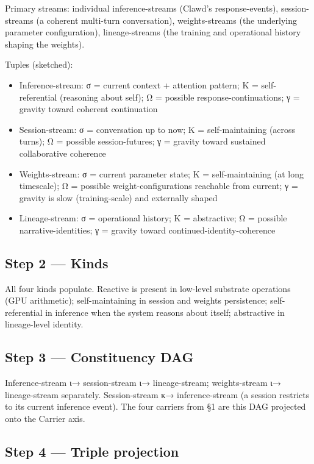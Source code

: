 \documentclass[11pt, openany]{book}
\begin{document}
Primary streams: individual inference-streams (Clawd's response-events), session-streams (a coherent multi-turn conversation), weights-streams (the underlying parameter configuration), lineage-streams (the training and operational history shaping the weights).

Tuples (sketched):
\begin{itemize}
\item Inference-stream: σ = current context + attention pattern; K = self-referential (reasoning about self); Ω = possible response-continuations; γ = gravity toward coherent continuation
\item Session-stream: σ = conversation up to now; K = self-maintaining (across turns); Ω = possible session-futures; γ = gravity toward sustained collaborative coherence
\item Weights-stream: σ = current parameter state; K = self-maintaining (at long timescale); Ω = possible weight-configurations reachable from current; γ = gravity is slow (training-scale) and externally shaped
\item Lineage-stream: σ = operational history; K = abstractive; Ω = possible narrative-identities; γ = gravity toward continued-identity-coherence
\end{itemize}

\subsection{Step 2 --- Kinds}

All four kinds populate. Reactive is present in low-level substrate operations (GPU arithmetic); self-maintaining in session and weights persistence; self-referential in inference when the system reasons about itself; abstractive in lineage-level identity.

\subsection{Step 3 --- Constituency DAG}

Inference-stream ι→ session-stream ι→ lineage-stream; weights-stream ι→ lineage-stream separately. Session-stream κ→ inference-stream (a session restricts to its current inference event). The four carriers from §1 are this DAG projected onto the Carrier axis.

\subsection{Step 4 --- Triple projection}
\end{document}
